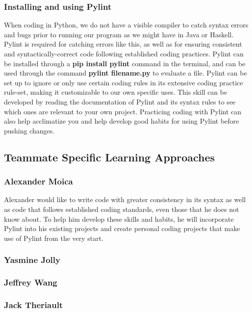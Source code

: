\documentclass[12pt, titlepage]{article}
\begin{document}
	\subsubsection*{Installing and using Pylint}
	When coding in Python, we do not have a visible compiler to catch syntax errors and bugs prior to running our program as we might have in Java or Haskell. Pylint is required for catching errors like this, as well as for ensuring consistent and syntactically-correct code following established coding practices. Pylint can be installed through a \textbf{pip install pylint} command in the terminal, and can be used through the command \textbf{pylint filename.py} to evaluate a file. Pylint can be set up to ignore or only use certain coding rules in its extensive coding practice rule-set, making it customizable to our own specific uses. This skill can be developed by reading the documentation of Pylint and its syntax rules to see which ones are relevant to your own project. Practicing coding with Pylint can also help acclimatize you and help develop good habits for using Pylint before pushing changes.
	
	\subsection*{Teammate Specific Learning Approaches}
	\subsubsection*{Alexander Moica}
	Alexander would like to write code with greater consistency in its syntax as well as code that follows established coding standards, even those that he does not know about. To help him develop these skills and habits, he will incorporate Pylint into his existing projects and create personal coding projects that make use of Pylint from the very start.
	
	\subsubsection*{Yasmine Jolly}
	
	\subsubsection*{Jeffrey Wang}
	
	\subsubsection*{Jack Theriault}
	
\end{document}
